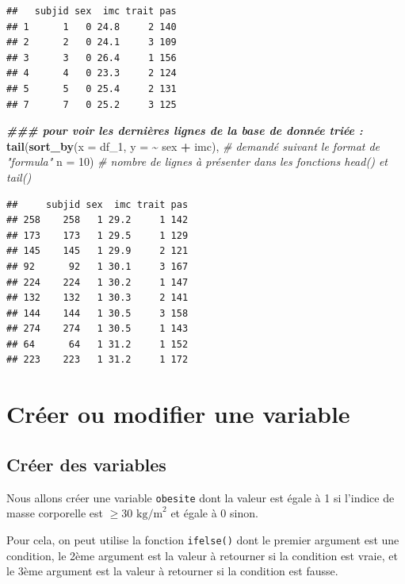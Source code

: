 \documentclass[
]{book}
\newenvironment{Shaded}{\begin{snugshade}}{\end{snugshade}}
\newcommand{\AttributeTok}[1]{\textcolor[rgb]{0.13,0.29,0.53}{#1}}
\newcommand{\CommentTok}[1]{\textcolor[rgb]{0.56,0.35,0.01}{\textit{#1}}}
\newcommand{\DecValTok}[1]{\textcolor[rgb]{0.00,0.00,0.81}{#1}}
\newcommand{\DocumentationTok}[1]{\textcolor[rgb]{0.56,0.35,0.01}{\textbf{\textit{#1}}}}
\newcommand{\FunctionTok}[1]{\textcolor[rgb]{0.13,0.29,0.53}{\textbf{#1}}}
\newcommand{\NormalTok}[1]{#1}
\newcommand{\SpecialCharTok}[1]{\textcolor[rgb]{0.81,0.36,0.00}{\textbf{#1}}}
\begin{document}
\begin{verbatim}
##   subjid sex  imc trait pas
## 1      1   0 24.8     2 140
## 2      2   0 24.1     3 109
## 3      3   0 26.4     1 156
## 4      4   0 23.3     2 124
## 5      5   0 25.4     2 131
## 7      7   0 25.2     3 125
\end{verbatim}

\begin{Shaded}
\begin{Highlighting}[]
\DocumentationTok{\#\#\# pour voir les dernières lignes de la base de donnée triée :}
\FunctionTok{tail}\NormalTok{(}\FunctionTok{sort\_by}\NormalTok{(}\AttributeTok{x =}\NormalTok{ df\_1, }
             \AttributeTok{y =} \SpecialCharTok{\textasciitilde{}}\NormalTok{ sex }\SpecialCharTok{+}\NormalTok{ imc), }\CommentTok{\# demandé suivant le format de "formula"}
     \AttributeTok{n =} \DecValTok{10}\NormalTok{) }\CommentTok{\# nombre de lignes à présenter dans les fonctions head() et tail()}
\end{Highlighting}
\end{Shaded}

\begin{verbatim}
##     subjid sex  imc trait pas
## 258    258   1 29.2     1 142
## 173    173   1 29.5     1 129
## 145    145   1 29.9     2 121
## 92      92   1 30.1     3 167
## 224    224   1 30.2     1 147
## 132    132   1 30.3     2 141
## 144    144   1 30.5     3 158
## 274    274   1 30.5     1 143
## 64      64   1 31.2     1 152
## 223    223   1 31.2     1 172
\end{verbatim}

\section{Créer ou modifier une variable}\label{cruxe9er-ou-modifier-une-variable}

\subsection{Créer des variables}\label{cruxe9er-des-variables}

Nous allons créer une variable \texttt{obesite} dont la valeur est égale à 1 si l'indice de masse corporelle est \(\geq 30\text{ kg/m}^2\) et égale à 0 sinon.

Pour cela, on peut utilise la fonction \texttt{ifelse()} dont le premier argument est une condition, le 2ème argument est la valeur à retourner si la condition est vraie, et le 3ème argument est la valeur à retourner si la condition est fausse.
\end{document}
